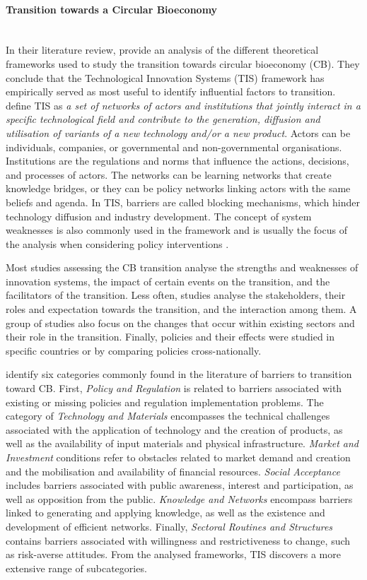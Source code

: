 \paragraph{Transition towards a Circular Bioeconomy} \mbox{}\\
In their literature review, \cite{gottinger2020studying} provide an analysis of the different theoretical frameworks used to study the transition towards circular bioeconomy (CB). They conclude that the Technological Innovation Systems (TIS) framework has empirically served as most useful to identify influential factors to transition. \cite{markard2008technological} define TIS as \textit{a set of networks of actors and institutions that jointly interact in a specific technological field and contribute to the generation, diffusion and utilisation of variants of a new technology and/or a new product}. Actors can be individuals, companies, or governmental and non-governmental organisations. Institutions are the regulations and norms that influence the actions, decisions, and processes of actors. The networks can be learning networks that create knowledge bridges, or they can be policy networks linking actors with the same beliefs and agenda. In TIS, barriers are called blocking mechanisms, which hinder technology diffusion and industry development. The concept of system weaknesses is also commonly used in the framework and is usually the focus of the analysis when considering policy interventions \citep{giurca2017forest}.

Most studies assessing the CB transition analyse the strengths and weaknesses of innovation systems, the impact of certain events on the transition, and the facilitators of the transition. Less often, studies analyse the stakeholders, their roles and expectation towards the transition, and the interaction among them. A group of studies also focus on the changes that occur within existing sectors and their role in the transition. Finally, policies and their effects were studied in specific countries or by comparing policies cross-nationally.

\citeauthor{gottinger2020studying} identify six categories commonly found in the literature of barriers to transition toward CB.  
First, \textit{Policy and Regulation} is related to barriers associated with existing or missing policies and regulation implementation problems.
The category of \textit{Technology and Materials} encompasses the technical challenges associated with the application of technology and the creation of products, as well as the availability of input materials and physical infrastructure. 
\textit{Market and Investment} conditions refer to obstacles related to market demand and creation and the mobilisation and availability of financial resources. \textit{Social Acceptance} includes barriers associated with public awareness, interest and participation, as well as opposition from the public. \textit{Knowledge and Networks} encompass barriers linked to generating and applying knowledge, as well as the existence and development of efficient networks. Finally, \textit{Sectoral Routines and Structures} contains barriers associated with willingness and restrictiveness to change, such as risk-averse attitudes. From the analysed frameworks, TIS discovers a more extensive range of subcategories.

